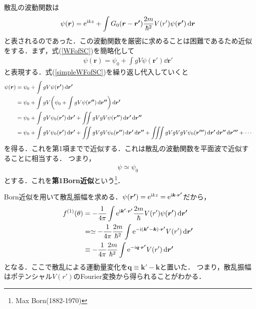 \documentclass{report}
\begin{document}
 散乱の波動関数は
 \begin{align}
  \label{WFofSC}
  \psi(\bm{r}) = \mathrm{e}^{\mathrm{i} kz} + \int G_0 (\bm{r} - \bm{r'}) \frac{2m}{\hbar^2} V(r') \psi(\bm{r'}) \dd{\bm{r}}
 \end{align}
 と表されるのであった．この波動関数を厳密に求めることは困難であるため近似をする．まず，式(\ref{WFofSC})を簡略化して
 \begin{align}
  \label{simpleWFofSC}
  \psi(\bm{r}) = \psi_0 + \int g V \psi(\bm{r'}) \dd{\bm{r'}}
 \end{align}
 と表現する．式(\ref{simpleWFofSC})を繰り返し代入していくと
 \begin{align}
  \psi(\bm{r}) &= \psi_0 + \int g V \psi(\bm{r'}) \dd{\bm{r'}}\\
  &= \psi_0 + \int gV \qty(\psi_0 + \int g V \psi(\bm{r''}) \dd{\bm{r''}}) \dd{\bm{r'}}\\
  &= \psi_0 + \int g V \psi_0(\bm{r'}) \dd{\bm{r'}} + \iint gVgV \psi(\bm{r''}) \dd{\bm{r'}} \dd{\bm{r''}}\\
  &= \psi_0 + \int g V \psi_0(\bm{r'}) \dd{\bm{r'}} + \iint gVgV \psi_0(\bm{r''}) \dd{\bm{r'}} \dd{\bm{r''}} + \iiint gVgVgV \psi_0(\bm{r'''}) \dd{\bm{r'}} \dd{\bm{r''}} \dd{\bm{r'''}} + \cdots
 \end{align}
 を得る．これを第1項までで近似する．これは散乱の波動関数を平面波で近似することに相当する．
 つまり，
 \begin{align}
  \psi \simeq \psi_0
 \end{align}
 とする．これを\textbf{第1Born近似}という\footnote{Max Born(1882-1970)}．

 Born近似を用いて散乱振幅を求める．$\psi(\bm{r'}) = \mathrm{e}^{\mathrm{i} kz} = \mathrm{e}^{\mathrm{i} \bm{k}\cdot\bm{r'}}$だから，
 \begin{align}
  f^{(1)}(\theta) &= -\frac{1}{4\pi} \int \mathrm{e}^{\mathrm{i} \bm{k'} \cdot \bm{r'}} \frac{2m}{\hbar} V(r') \psi(\bm{r'}) \dd{\bm{r'}}\\
  &= \simeq -\frac{1}{4\pi}\frac{2m}{\hbar^2}\int\mathrm{e}^{-\mathrm{i} (\bm{k'} - \bm{k})\cdot \bm{r'}} V(r') \dd{\bm{r'}}\\
  & \equiv -\frac{1}{4\pi}\frac{2m}{\hbar^2}\int\mathrm{e}^{-\mathrm{i} \bm{q}\cdot \bm{r'}} V(r') \dd{\bm{r'}}
 \end{align}
 となる．ここで散乱による運動量変化を$\bm{q}\equiv \bm{k'} - \bm{k}$と置いた．
 つまり，散乱振幅はポテンシャル$V(r')$のFourier変換から得られることがわかる．
\end{document}

